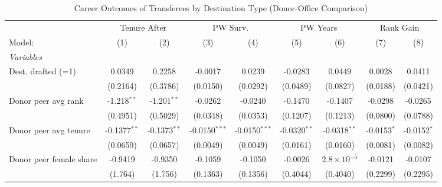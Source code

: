 \begin{table}[htbp]
\centering
\caption{Career Outcomes of Transferees by Destination Type (Donor-Office Comparison)}
\label{tab:transfer-dest-type}
\footnotesize
\begin{threeparttable}
\begin{tabular}{lcccccccc}
   \tabularnewline \midrule \midrule
    & \multicolumn{2}{c}{Tenure After} & \multicolumn{2}{c}{PW Surv.} & \multicolumn{2}{c}{PW Years} & \multicolumn{2}{c}{Rank Gain} \\ 
   Model:                              & (1)            & (2)            & (3)             & (4)             & (5)            & (6)                  & (7)           & (8)\\  
   \midrule
   \emph{Variables}\\
   Dest. drafted (=1)                  & 0.0349         & 0.2258         & -0.0017         & 0.0239          & -0.0283        & 0.0449               & 0.0028        & 0.0411\\   
                                       & (0.2164)       & (0.3786)       & (0.0150)        & (0.0292)        & (0.0489)       & (0.0827)             & (0.0188)      & (0.0421)\\   
   Donor peer avg rank                 & -1.218$^{**}$  & -1.201$^{**}$  & -0.0262         & -0.0240         & -0.1470        & -0.1407              & -0.0298       & -0.0265\\   
                                       & (0.4951)       & (0.5029)       & (0.0348)        & (0.0353)        & (0.1207)       & (0.1213)             & (0.0800)      & (0.0788)\\   
   Donor peer avg tenure               & -0.1377$^{**}$ & -0.1373$^{**}$ & -0.0150$^{***}$ & -0.0150$^{***}$ & -0.0320$^{**}$ & -0.0318$^{**}$       & -0.0153$^{*}$ & -0.0152$^{*}$\\   
                                       & (0.0659)       & (0.0657)       & (0.0049)        & (0.0049)        & (0.0161)       & (0.0160)             & (0.0081)      & (0.0082)\\   
   Donor peer female share             & -0.9419        & -0.9350        & -0.1059         & -0.1050         & -0.0026        & $2.8\times 10^{-5}$  & -0.0121       & -0.0107\\   
                                       & (1.764)        & (1.756)        & (0.1363)        & (0.1356)        & (0.4044)       & (0.4040)             & (0.2299)      & (0.2295)\\   

\end{tabular}
\end{threeparttable}
\end{table}
